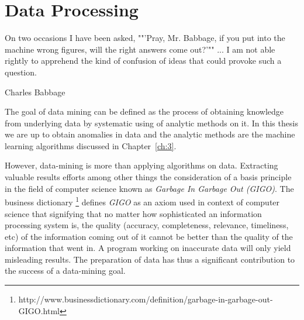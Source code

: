\chapter{Data Processing}\label{ch:2}
\epigraph{On two occasions I have been asked, ""'Pray, Mr. Babbage, if you put into the machine wrong figures, will the right answers come out?'"" ... I am not able rightly to apprehend the kind of confusion of ideas that could provoke such a question.}{Charles Babbage}

The goal of data mining can be defined as the process of obtaining knowledge from underlying data by systematic using of analytic methods on it. In this thesis we are up to obtain anomalies in data and the analytic methods are the machine learning algorithms discussed in Chapter~\ref{ch:3}. 

However, data-mining is more than applying algorithms on data. Extracting valuable results efforts among other things the consideration of a basis principle in the field of computer science known as \textit{Garbage In Garbage Out (GIGO)}. The business dictionary \footnote{http://www.businessdictionary.com/definition/garbage-in-garbage-out-GIGO.html}  defines \textit{GIGO} as an axiom used in context of computer science that signifying that no matter how sophisticated an information processing system is, the quality (accuracy, completeness, relevance, timeliness, etc) of the information coming out of it cannot be better than the quality of the information that went in. A program working on inaccurate data will only yield misleading results. The preparation of data has thus a significant contribution to the success of a data-mining goal.

